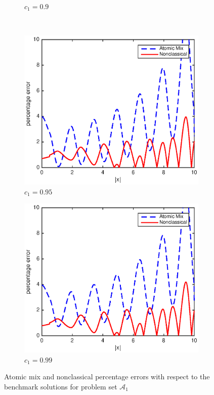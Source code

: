 \documentclass[12pt]{article}
\newcommand{\seta}{\mathcal{A}}
\begin{document}
{\begin{figure}[p]
\begin{subfigure}{0.495\textwidth}
        \caption{$c_1 = 0.9$}
        \label{figerrA90}
    \end{subfigure}
    \\
    \centering
    \begin{subfigure}{0.495\textwidth}
        \centering
        \includegraphics[width=\textwidth]{NSE_err_A95.eps}
        \caption{$c_1 = 0.95$}
        \label{figerrA95}
    \end{subfigure}
    \hfill
    \begin{subfigure}{0.495\textwidth}
        \centering
        \includegraphics[width=\textwidth]{NSE_err_A99.eps}
        \caption{$c_1 = 0.99$}
        \label{figerrA99}
    \end{subfigure}
    \caption{Atomic mix and nonclassical percentage errors with respect to the benchmark solutions for problem set $\seta_1$}
    \label{figerrA2}
\end{figure}





}
\end{document}
